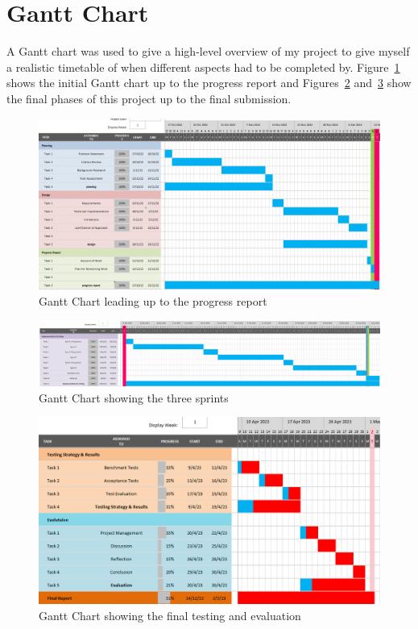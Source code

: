 
\section{Gantt Chart}

A Gantt chart was used to give a high-level overview of my project to give myself a realistic timetable of when different aspects had to be completed by. Figure~\ref{fig:gantt-chart-1} shows the initial Gantt chart up to the progress report and Figures~\ref{fig:gantt-chart-2} and~\ref{fig:gantt-chart-3} show the final phases of this project up to the final submission.

\begin{figure}[H]
  \centering
  \includegraphics[width=\textwidth]{assets/images/charts/gantt/progress.png}
  \caption{Gantt Chart leading up to the progress report}
  \label{fig:gantt-chart-1}
\end{figure}

\begin{figure}[H]
  \centering
  \includegraphics[width=\textwidth]{assets/images/charts/gantt/impl.png}
  \caption{Gantt Chart showing the three sprints}
  \label{fig:gantt-chart-2}
\end{figure}

\begin{figure}[H]
  \centering
  \includegraphics[width=\textwidth]{assets/images/charts/gantt/testing-eval.png}
  \caption{Gantt Chart showing the final testing and evaluation}
  \label{fig:gantt-chart-3}
\end{figure}
